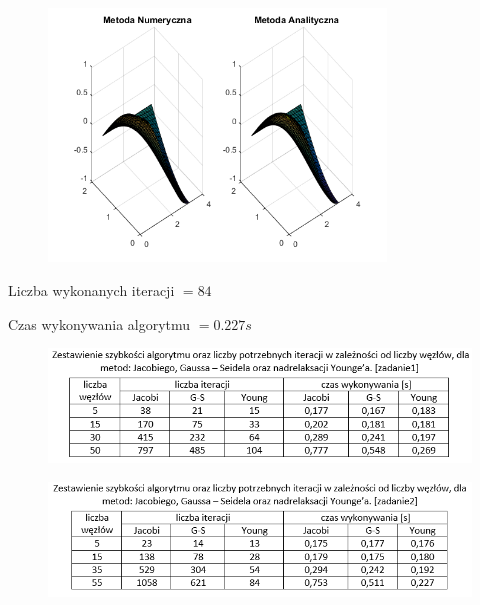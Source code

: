 \begin{figure}[!ht]
	\begin{center}
		\includegraphics[width=0.8\textwidth]{Lab6/charts/young/zad2/55.png}
	\end{center}
\end{figure}

Liczba wykonanych iteracji $ = 84 $

Czas wykonywania algorytmu $ = 0.227 s$

\begin{figure}[!ht]
	\begin{center}
		\includegraphics[width=1\textwidth]{Lab6/charts/zestawienie_zad1.png}
	\end{center}
\end{figure}

\begin{figure}[!ht]
	\begin{center}
		\includegraphics[width=1\textwidth]{Lab6/charts/zestawienie_zad2.png}
	\end{center}
\end{figure}